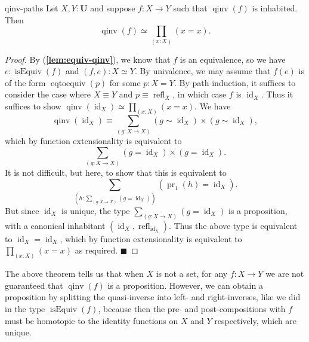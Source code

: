 \documentclass{article}
\renewcommand{\qed}{\hfill{\color{MPBthm}\( \blacksquare \)}}
\newcommand{\U}{\mathbf{U}}
\newcommand{\tpi}[1]{\prod_{(#1)}}
\newcommand{\tsigma}[1]{\sum_{(#1)}}
\DeclareMathOperator{\pr}{pr}
\newcommand{\1}{\textbf{1}}
\newcommand{\0}{\mathbf{0}}
\newcommand{\2}{\textbf{2}}
\DeclareMathOperator{\refl}{refl}
\DeclareMathOperator{\id}{id}
\DeclareMathOperator{\isEquiv}{isEquiv}
\DeclareMathOperator{\qinv}{qinv}
\DeclareMathOperator{\eqtoequiv}{eqtoequiv}
\begin{document}
\begin{thm}{}{qinv-paths} Let \( X, Y : \U \) and suppose \( f : X \to Y \) such that \( \qinv(f) \) is inhabited. Then
\[ \qinv(f) \simeq \tpi{x : X} (x = x). \]
\begin{proof}
	By (\textbf{\color{MPBthm}\ref{lem:equiv-qinv}}), we know that \( f \) is an equivalence, so we have \( e : \isEquiv(f) \) and \( (f, e) : X \simeq Y \). By univalence, we may assume that \( f(e) \) is of the form \( \eqtoequiv(p) \) for some \( p : X = Y \). By path induction, it suffices to consider the case where \( X \equiv Y \) and \( p \equiv \refl_{X} \), in which case \( f \) is \( \id_{X} \). Thus it suffices to show \( \qinv(\id_{X}) \simeq \tpi{x : X} (x = x) \).
	We have
	\[ \qinv(\id_{X}) \equiv \tsigma{g : X \to X} (g \sim \id_{X}) \times (g \sim \id_{X}), \]
	which by function extensionality is equivalent to
	\[ \tsigma{g : X \to X} (g = \id_{X}) \times (g = \id_{X}). \]
	It is not difficult, but  here, to show that this is equivalent to
	\[ \tsigma{h : \tsigma{g : X \to X} (g = \id_{X})} (\pr_{1}(h) = \id_{X}). \]
	But since \( \id_{X} \) is unique, the type \( \tsigma{g : X \to X} (g = \id_{X}) \) is a proposition, with a canonical inhabitant \( (\id_{X}, \refl_{\id_{X}}) \). Thus the above type is equivalent to \( \id_{X} = \id_{X} \), which by function extensionality is equivalent to \( \tpi{x : X} (x = x) \) as required. \qed
\end{proof} \end{thm}
The above theorem tells us that when \( X \) is not a set, for any \( f : X \to Y \) we are not guaranteed that \( \qinv(f) \) is a proposition. However, we can obtain a proposition by splitting the quasi-inverse into left- and right-inverses, like we did in the type \( \isEquiv(f) \), because then the pre- and post-compositions with \( f \) must be homotopic to the identity functions on \( X \) and \( Y \) respectively, which are unique.
\end{document}
